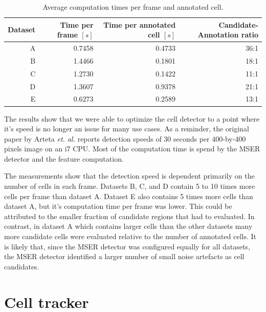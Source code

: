 		\begin{table}[h]
			\centering
			\begin{tabular}{rrrr}
				Dataset & Time per frame  $\left[ s \right]$ & Time per annotated cell  $\left[ s \right]$ & Candidate-Annotation ratio \\
			\hline
				      A &                             0.7458 &                                      0.4733 &                       36:1 \\
				      B &                             1.4466 &                                      0.1801 &                       18:1 \\
				      C &                             1.2730 &                                      0.1422 &                       11:1 \\
				      D &                             1.3607 &                                      0.9378 &                       21:1 \\
				      E &                             0.6273 &                                      0.2589 &                       13:1
			\end{tabular} 
			\caption{Average computation times per frame and annotated cell.}
			\label{tab:results_detector_speed}
		\end{table}

		The results show that we were able to optimize the cell detector to a point where it's speed is no longer an issue for many use cases. As a reminder, the original paper by Arteta \emph{et. al.} \cite{arteta12} reports detection speeds of 30 seconds per 400-by-400 pixels image on an i7 CPU. Most of the computation time is spend by the MSER detector and the feature computation.
		
		The measurements show that the detection speed is dependent primarily on the number of cells in each frame. Datasets B, C, and D contain 5 to 10 times more cells per frame than dataset A. Dataset E also contains 5 times more cells than dataset A, but it's computation time per frame was lower. This could be attributed to the smaller fraction of candidate regions that had to evaluated. In contrast, in dataset A which contains larger cells than the other datasets many more candidate cells were evaluated relative to the number of annotated cells. It is likely that, since the MSER detector was configured equally for all datasets, the MSER detector identified a larger number of small noise artefacts as cell candidates.
		
\section{Cell tracker \statusfirstdraft}
	\label{sec:results_tracker}
	
